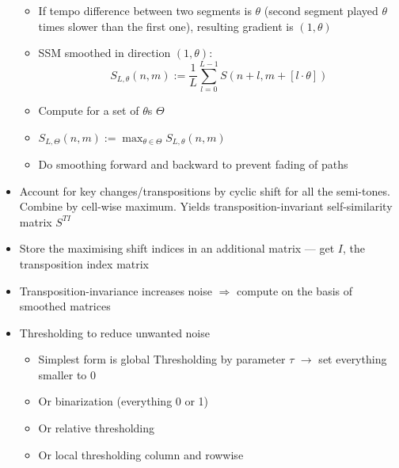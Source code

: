 \begin{itemize}
\begin{itemize}
			\item
				If tempo difference between two segments is $\theta$ (second segment played $\theta$ times slower than the first one), resulting gradient is $(1,\theta)$
			\item
				SSM smoothed in direction $(1,\theta)$:
				$$S_{L,\theta}(n,m) := \frac1L \sum_{l = 0}^{L-1} S(n+l,m+[l\cdot \theta])$$
			\item
				Compute for a set of $\theta$s $\Theta$
			\item
				$S_{L,\Theta}(n,m) := \max_{\theta \in \Theta} S_{L,\theta}(n,m)$
			\item
				Do smoothing forward and backward to prevent fading of paths
		\end{itemize}
	\item
		Account for key changes/transpositions by cyclic shift for all the semi-tones. Combine by cell-wise maximum. Yields transposition-invariant self-similarity matrix $S^{TI}$
	\item
		Store the maximising shift indices in an additional matrix --- get $I$, the transposition index matrix
	\item
		Transposition-invariance increases noise $\Rightarrow$ compute on the basis of smoothed matrices
	\item
		Thresholding to reduce unwanted noise
		\begin{itemize}
			\item
				Simplest form is global Thresholding by parameter $\tau$ $\rightarrow$ set everything smaller to 0
				\item
					Or binarization (everything 0 or 1)
				\item
					Or relative thresholding
				\item
					Or local thresholding column and rowwise

		\end{itemize}
\end{itemize}

